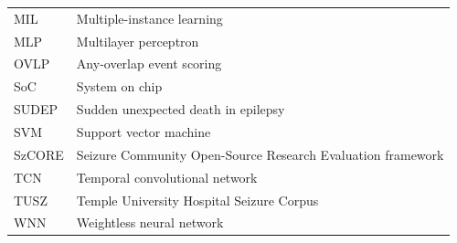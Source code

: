 \begin{longtable}{@{}p{30mm}p{120mm}@{}}
MIL & Multiple-instance learning\\
MLP & Multilayer perceptron\\
OVLP & Any-overlap event scoring\\
SoC & System on chip\\
SUDEP & Sudden unexpected death in epilepsy\\
SVM & Support vector machine\\
SzCORE & Seizure Community Open-Source Research Evaluation framework\\
TCN & Temporal convolutional network\\
TUSZ & Temple University Hospital Seizure Corpus\\
WNN & Weightless neural network\\
\end{longtable}
